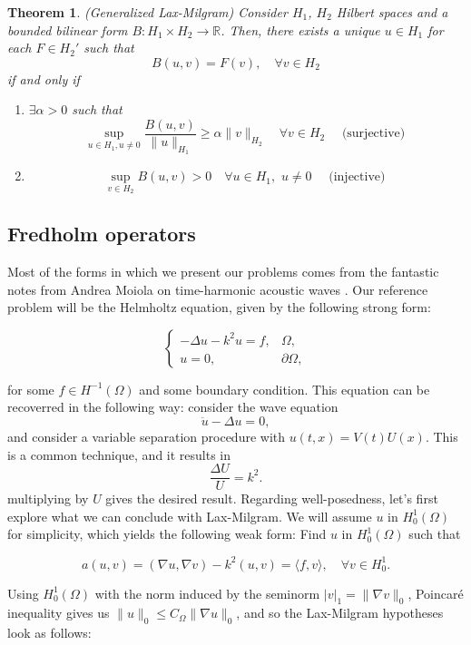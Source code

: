\documentclass{article}
\newtheorem{theorem}{Theorem}
\begin{document}
\begin{theorem}(Generalized Lax-Milgram)
    Consider \(H_1\), \(H_2\) Hilbert spaces and a bounded bilinear form 
    \(B:H_1\times H_2 \to \mathbb{R}\). Then, there exists a unique \(u\in H_1\) for each 
    \(F\in H_2'\) such that \[B(u,v) = F(v),\quad \forall v \in H_2\] if and only if 
    \begin{enumerate}
        \item \(\exists \alpha > 0\) such that \[\sup_{u\in H_1,u\neq 0}
        \frac{B(u,v)}{\lVert u \rVert_{H_1}} \ge \alpha \lVert v \rVert_{H_2}
        \quad \forall v\in H_2\quad \text{ (surjective) }\]
        \item \[\sup_{v\in H_2} B(u,v) > 0 
        \quad \forall u\in H_1,\,\, u\neq 0
        \quad \text{ (injective) }\]
    \end{enumerate}
\end{theorem}

\subsection{Fredholm operators}

Most of the forms in which we present our problems comes from the fantastic notes from Andrea Moiola on time-harmonic acoustic waves \cite{moiola2021scattering}. Our reference problem will be the Helmholtz equation, given by the following strong form:

\[
\left\{
\begin{array}{rc}
    -\Delta u -k^2 u = f, &\Omega,\\
    u=0, &\partial\Omega,
\end{array}\right.
\]

for some $f\in H^{-1}(\Omega)$ and some boundary condition. This equation can be recoverred in the following way: consider the wave equation
    $$ \ddot u - \Delta u = 0, $$
and consider a variable separation procedure with $u(t,x) = V(t)U(x)$. This is a common technique, and it results in 
    $$ \frac{\Delta U}{U} = k^2.$$
multiplying by $U$ gives the desired result. Regarding well-posedness, let's first explore what we can conclude with Lax-Milgram. We will assume $u$ in $H_0^1(\Omega)$ for simplicity, which yields the following weak form: Find $u$ in $H_0^1(\Omega)$ such that

\[
a(u,v) = (\nabla u, \nabla v) - k^2(u,v) = \langle f, v\rangle, \quad \forall v\in H_0^1.
\]

Using $H_0^1(\Omega)$ with the norm induced by the seminorm $|v|_1 = \|\nabla v\|_0$, Poincaré inequality gives us $\|u\|_0\leq C_{\Omega}\|\nabla u\|_0$, and so the Lax-Milgram hypotheses look as follows: 
\end{document}

